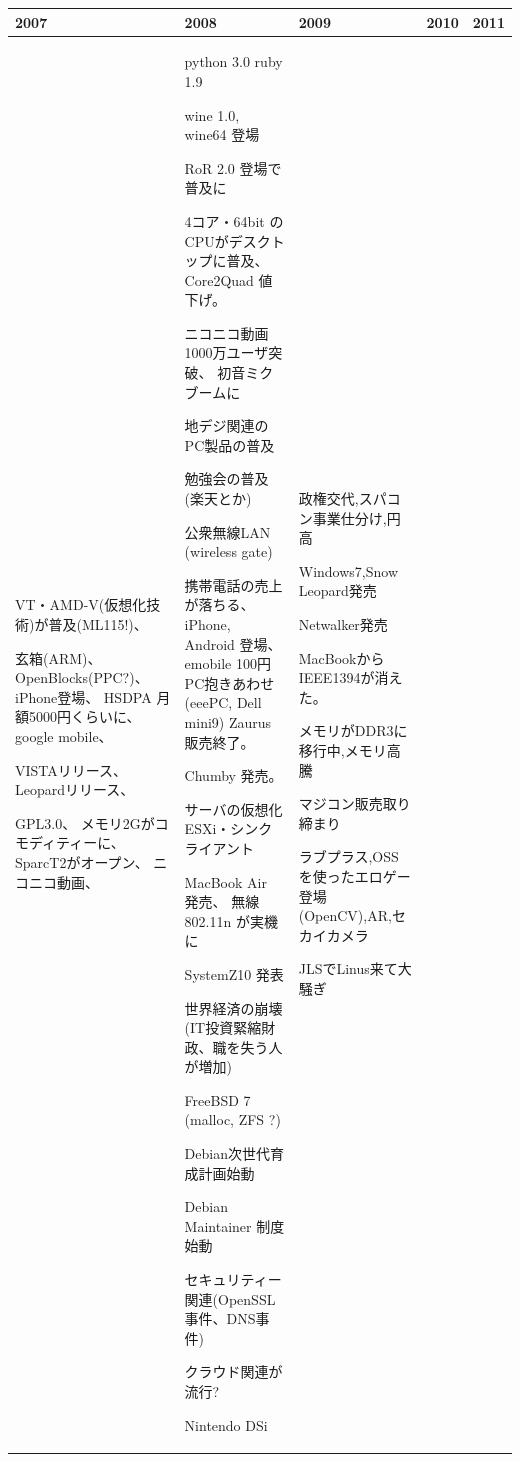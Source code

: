 \documentclass[mingoth,a4paper]{jsarticle}
\begin{document}
{\footnotesize
\begin{tabular}[t]{|p{8em}|p{8em}|p{12em}|p{8em}|p{8em}|}
\hline
2007 &2008 &2009 & 2010 & 2011 \\
\hline
VT・AMD-V(仮想化技術)が普及(ML115!)、

玄箱(ARM)、
OpenBlocks(PPC?)、
iPhone登場、 
HSDPA 月額5000円くらいに、
google mobile、

VISTAリリース、 
Leopardリリース、 

GPL3.0、
メモリ2Gがコモディティーに、
SparcT2がオープン、 
ニコニコ動画、
& 
python 3.0
ruby 1.9

wine 1.0, wine64 登場

RoR 2.0 登場で普及に

4コア・64bit のCPUがデスクトップに普及、
Core2Quad 値下げ。

ニコニコ動画1000万ユーザ突破、
初音ミクブームに

地デジ関連のPC製品の普及

勉強会の普及(楽天とか)

公衆無線LAN (wireless gate)

携帯電話の売上が落ちる、
iPhone, Android 登場、
emobile 100円PC抱きあわせ
(eeePC, Dell mini9)
Zaurus販売終了。

Chumby 発売。

サーバの仮想化 ESXi・シンクライアント

MacBook Air 発売、
無線 802.11n が実機に

SystemZ10 発表

世界経済の崩壊(IT投資緊縮財政、職を失う人が増加)

FreeBSD 7 (malloc, ZFS ?)

Debian次世代育成計画始動

Debian Maintainer 制度始動

セキュリティー関連(OpenSSL 事件、DNS事件)

クラウド関連が流行?

Nintendo DSi

&
政権交代,スパコン事業仕分け,円高

Windows7,Snow Leopard発売

Netwalker発売

MacBookからIEEE1394が消えた。

メモリがDDR3に移行中,メモリ高騰

マジコン販売取り締まり

ラブプラス,OSSを使ったエロゲー登場(OpenCV),AR,セカイカメラ

JLSでLinus来て大騒ぎ


\end{tabular}}
\end{document}
